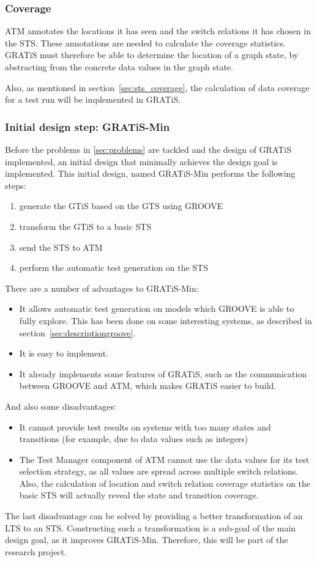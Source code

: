 \subsubsection{Coverage}
ATM annotates the locations it has seen and the switch relations it has chosen in the STS. These annotations are needed to calculate the coverage statistics. GRATiS must therefore be able to determine the location of a graph state, by abstracting from the concrete data values in the graph state.

Also, as mentioned in section~\ref{sec:sts_coverage}, the calculation of data coverage for a test run will be implemented in GRATiS.

\subsubsection{Initial design step: GRATiS-Min}
Before the problems in \ref{sec:problems} are tackled and the design of GRATiS implemented, an initial design that minimally achieves the design goal is implemented. This initial design, named GRATiS-Min performs the following steps:
\begin{enumerate}
  \item generate the GTiS based on the GTS using GROOVE
  \item transform the GTiS to a basic STS
  \item send the STS to ATM
  \item perform the automatic test generation on the STS
\end{enumerate}

There are a number of advantages to GRATiS-Min:
\begin{itemize}
  \item It allows automatic test generation on models which GROOVE is able to fully explore. This has been done on some interesting systems, as described in section~\ref{sec:descriptiongroove}.
  \item It is easy to implement.
  \item It already implements some features of GRATiS, such as the communication between GROOVE and ATM, which makes GRATiS easier to build.
\end{itemize}
And also some disadvantages:
\begin{itemize}
  \item It cannot provide test results on systems with too many states and transitions (for example, due to data values such as integers)
  \item The Test Manager component of ATM cannot use the data values for its test selection strategy, as all values are spread across multiple switch relations. Also, the calculation of location and switch relation coverage statistics on the basic STS will actually reveal the state and transition coverage.
\end{itemize}
The last disadvantage can be solved by providing a better transformation of an LTS to an STS. Constructing such a transformation is a sub-goal of the main design goal, as it improves GRATiS-Min. Therefore, this will be part of the research project.

